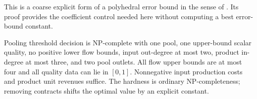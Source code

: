 This is a coarse explicit form of a polyhedral error bound in the sense
of \citet[Section~2]{s3:hoffman1952}. Its proof provides the coefficient
control needed here without computing a best error-bound constant.

\begin{theorem}\label{s3:upper-only}
Pooling threshold decision is NP-complete with one pool, one upper-bound
scalar quality, no positive lower flow bounds, input out-degree at most
two, product in-degree at most three, and two pool outlets. All flow
upper bounds are at most four and all quality data can lie in $[0,1]$.
Nonnegative input production costs and product unit revenues suffice.
The hardness is ordinary NP-completeness; removing contracts shifts the
optimal value by an explicit constant.
\end{theorem}
